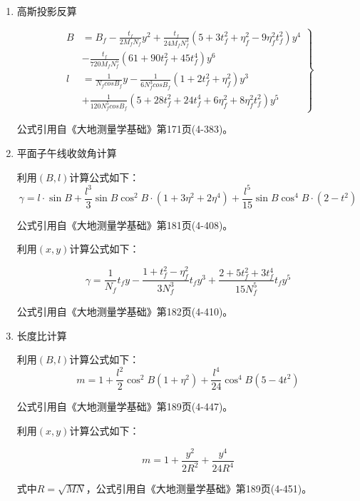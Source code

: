 \begin{enumerate}
          公式引用自《大地测量学基础》第169页(4-367)。

    \item 高斯投影反算

          \begin{equation}
              \left  .
              \begin{aligned}
                  B & =B_f - \frac{t_f}{2M_f N_f }y^2 +\frac{t_f}{24 M_f N_f ^3}
                  (5 + 3t_f ^2  + \eta_f ^2 - 9\eta_f ^2 t_f^2)y^4                                             \\
                    & - \frac{t_f}{720 M_f N_f ^5}(61 + 90t_f ^2 + 45t_f ^4)y^6                                \\
                  l & =\frac{1}{N_f cosB_f}y - \frac{1}{6N_f ^3 cosB_f}(1 + 2t_f ^2 + \eta_f ^2)y^3            \\
                    & + \frac{1}{120N_f ^5 cosB_f}(5 + 28t_f ^2 + 24t_f ^4 + 6\eta_f ^2 +8\eta_f ^2 t_f ^2)y^5
              \end{aligned}
              \right \}
          \end{equation}

          公式引用自《大地测量学基础》第171页(4-383)。


    \item 平面子午线收敛角计算

          利用$(B, l)$计算公式如下：
          $$\gamma = l \cdot \sin B  + \frac{l^3}{3} \sin B \cos ^2 B \cdot (1 + 3 \eta^2 + 2 \eta^4)
              + \frac{ l^5}{15}\sin B \cos ^4 B \cdot (2 - t^2)$$

          公式引用自《大地测量学基础》第181页(4-408)。

          利用$(x, y)$计算公式如下：

          $$\gamma = \frac{1}{N_f}t_f y - \frac{1+t_f ^2 - \eta_f ^2}{3N_f ^3}t_f y^3
              + \frac{2+5t_f^2+3t_f^4}{15N_f ^5}t_fy^5$$

          公式引用自《大地测量学基础》第182页(4-410)。

    \item 长度比计算

          利用$(B, l)$计算公式如下：
          $$m=1+\frac{l^2}{2} \cos ^2 B(1+\eta^2) + \frac{l^4}{24}\cos ^4 B(5-4t^2)$$

          公式引用自《大地测量学基础》第189页(4-447)。

          利用$(x, y)$计算公式如下：

          $$m=1+\frac{y^2}{2R^2} + \frac{y^4}{24R^4}$$

          式中$R=\sqrt{MN}$，公式引用自《大地测量学基础》第189页(4-451)。

\end{enumerate}

